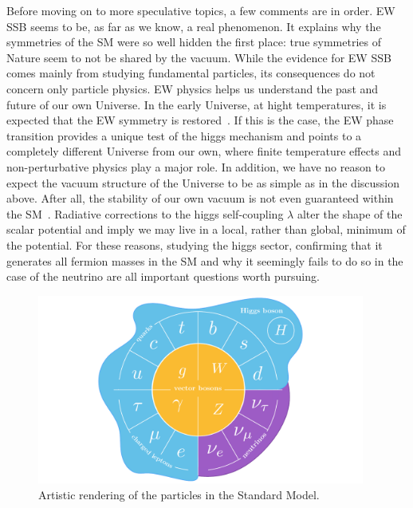 Before moving on to more speculative topics, a few comments are in order. EW SSB seems to be, as far as we know, a real phenomenon. It explains why the symmetries of the SM were so well hidden the first place: true symmetries of Nature seem to not be shared by the vacuum. While the evidence for EW SSB comes mainly from studying fundamental particles, its consequences do not concern only particle physics. EW physics helps us understand the past and future of our own Universe. In the early Universe, at hight temperatures, it is expected that the EW symmetry is restored~\cite{Kirzhnits:1972ut,Dolan:1973qd,Weinberg:1974hy}. If this is the case, the EW phase transition provides a unique test of the higgs mechanism and points to a completely different Universe from our own, where finite temperature effects and non-perturbative physics play a major role. In addition, we have no reason to expect the vacuum structure of the Universe to be as simple as in the discussion above. After all, the stability of our own vacuum is not even guaranteed within the SM~\cite{Cabibbo:1979ay,Degrassi:2012ry}. Radiative corrections to the higgs self-coupling $\lambda$ alter the shape of the scalar potential and imply we may live in a local, rather than global, minimum of the potential. For these reasons, studying the higgs sector, confirming that it generates all fermion masses in the SM and why it seemingly fails to do so in the case of the neutrino are all important questions worth pursuing.

\begin{figure}
 \includegraphics[width=0.96\textwidth]{SM_zoo.pdf}
 \caption{Artistic rendering of the particles in the Standard Model. \label{fig:SM_diagram}}
\end{figure}



%
%

